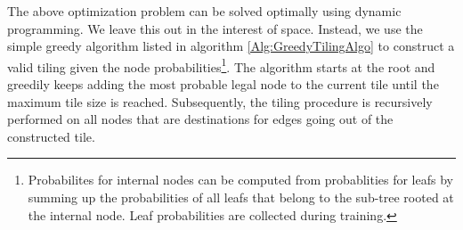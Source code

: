 The above optimization problem can be solved optimally using dynamic programming. 
We leave this out in the interest of space. 
Instead, we use the simple greedy algorithm listed in algorithm \ref{Alg:GreedyTilingAlgo} to construct a valid tiling given the node probabilities\footnote{Probabilites for internal nodes can be computed from probablities for leafs by summing up the probabilities of all leafs that belong to the sub-tree rooted at the internal node. Leaf probabilities are collected during training.}.
The algorithm starts at the root and greedily keeps adding the most probable legal node to the current tile until the maximum tile size is reached.
Subsequently, the tiling procedure is recursively performed on all nodes that are destinations for edges going out of the constructed tile.







